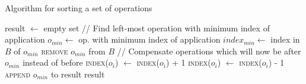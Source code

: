 \begin{algorithm}[!ht]
  \caption{Algorithm for sorting a set of operations}
  \label{alg:opsort}
  \begin{algorithmic}[5]
      \State result $\gets$ empty set
        \State // Find left-most operation with minimum index of application
        \State $o_{min} \gets$ op. with minimum index of application
        \State $index_{min} \gets$ index in $B$ of $o_{min}$
        \State \textsc{remove} $o_{min}$ from $B$
        \Statex
        \State // Compensate operations which will now be after $o_{min}$ instead of before
              \State \textsc{index}($o_i$) $\gets$ \textsc{index}($o_i$) + 1
            \EndIf
          \EndFor
              \State \textsc{index}($o_i$) $\gets$ \textsc{index}($o_i$) - 1
            \EndIf
          \EndFor
        \EndIf
        \State \textsc{append} $o_{min}$ to result
      \EndWhile
      \Statex
      \State \Return result
    \EndFunction
  \end{algorithmic}
\end{algorithm}
